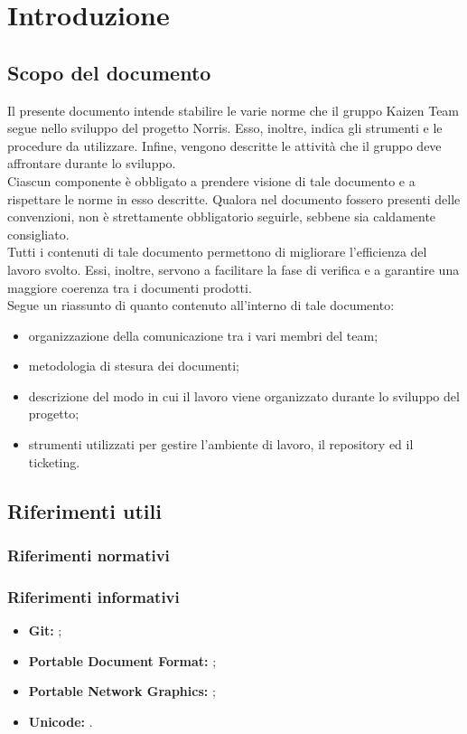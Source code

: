 \section{Introduzione}
	\subsection{Scopo del documento}
		Il presente documento intende stabilire le varie norme che il gruppo Kaizen Team segue nello sviluppo del progetto Norris. Esso, inoltre, indica gli strumenti e le procedure da utilizzare. Infine, vengono descritte le attività che il gruppo deve affrontare durante lo sviluppo.\\
		Ciascun componente è obbligato a prendere visione di tale documento e a rispettare le norme in esso descritte. Qualora nel documento fossero presenti delle convenzioni, non è strettamente obbligatorio seguirle, sebbene sia caldamente consigliato.\\
		Tutti i contenuti di tale documento permettono di migliorare l’efficienza del lavoro svolto. Essi, inoltre, servono a facilitare la fase di verifica e a garantire una maggiore coerenza tra i documenti prodotti.\\
		Segue un riassunto di quanto contenuto all'interno di tale documento:
		\begin{itemize}
			\item organizzazione della comunicazione tra i vari membri del team;
			\item metodologia di stesura dei documenti;
			\item descrizione del modo in cui il lavoro viene organizzato durante lo sviluppo del progetto;
			\item strumenti utilizzati per gestire l'ambiente di lavoro, il repository ed il ticketing.
		\end{itemize}

	
	

	\subsection{Riferimenti utili}
		\subsubsection{Riferimenti normativi}
		\subsubsection{Riferimenti informativi}
			\begin{itemize}
				\item \textbf{Git:} ;
				\item \textbf{Portable Document Format:} ;
				\item \textbf{Portable Network Graphics:} ;
				\item \textbf{Unicode:} .
			\end{itemize}